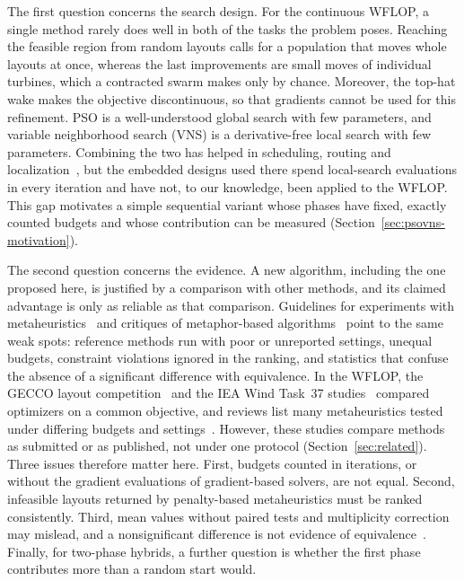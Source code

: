 The first question concerns the search design. For the continuous WFLOP, a single method rarely does well in both of the tasks the problem poses. Reaching the feasible region from random layouts calls for a population that moves whole layouts at once, whereas the last improvements are small moves of individual turbines, which a contracted swarm makes only by chance. Moreover, the top-hat wake makes the objective discontinuous, so that gradients cannot be used for this refinement. PSO is a well-understood global search with few parameters, and variable neighborhood search (VNS) is a derivative-free local search with few parameters. Combining the two has helped in scheduling, routing and localization~\cite{Tasgetiren2007,Marinakis2017,Gumaida2019}, but the embedded designs used there spend local-search evaluations in every iteration and have not, to our knowledge, been applied to the WFLOP. This gap motivates a simple sequential variant whose phases have fixed, exactly counted budgets and whose contribution can be measured (Section~\ref{sec:psovns-motivation}).

The second question concerns the evidence. A new algorithm, including the one proposed here, is justified by a comparison with other methods, and its claimed advantage is only as reliable as that comparison. Guidelines for experiments with metaheuristics~\cite{Hooker1995,Derrac2011,BartzBeielstein2020,LaTorre2021} and critiques of metaphor-based algorithms~\cite{Sorensen2015,Aranha2022} point to the same weak spots: reference methods run with poor or unreported settings, unequal budgets, constraint violations ignored in the ranking, and statistics that confuse the absence of a significant difference with equivalence. In the WFLOP, the GECCO layout competition~\cite{Wilson2018} and the IEA Wind Task~37 studies~\cite{Baker2019,Thomas2023} compared optimizers on a common objective, and reviews list many metaheuristics tested under differing budgets and settings~\cite{Azlan2021}. However, these studies compare methods as submitted or as published, not under one protocol (Section~\ref{sec:related}). Three issues therefore matter here. First, budgets counted in iterations, or without the gradient evaluations of gradient-based solvers, are not equal. Second, infeasible layouts returned by penalty-based metaheuristics must be ranked consistently. Third, mean values without paired tests and multiplicity correction~\cite{Benavoli2016} may mislead, and a nonsignificant difference is not evidence of equivalence~\cite{Lakens2017}. Finally, for two-phase hybrids, a further question is whether the first phase contributes more than a random start would.

